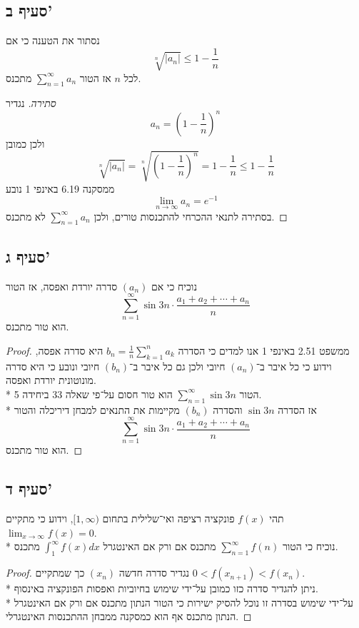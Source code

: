 \subsection{סעיף ב'}
נסתור את הטענה כי אם
\[
	\sqrt[n]{\lvert a_n \rvert} \le 1 - \frac{1}{n}
\]
לכל $n$ אז הטור $\sum_{n = 1}^{\infty} a_n$ מתכנס.
\begin{proof}[סתירה]
	נגדיר
	\[
		a_n = {(1 - \frac{1}{n})}^n
	\]
	ולכן כמובן
	\[
		\sqrt[n]{\lvert a_n \rvert}
		= \sqrt[n]{{(1 - \frac{1}{n})}^n}
		= 1 - \frac{1}{n}
		\le 1 - \frac{1}{n}
	\]
	ממסקנה 6.19 באינפי 1 נובע
	\[
		\lim_{n \to \infty} a_n = e^{-1}
	\]
	בסתירה לתנאי ההכרחי להתכנסות טורים, ולכן $\sum_{n = 1}^{\infty} a_n$ לא מתכנס.
\end{proof}

\subsection{סעיף ג'}
נוכיח כי אם $(a_n)$ סדרה יורדת ואפסה,
אז הטור
\[
	\sum_{n = 1}^{\infty} \sin 3n \cdot \frac{a_1 + a_2 + \cdots + a_n}{n}
\]
הוא טור מתכנס.
\begin{proof}
	ממשפט 2.51 באינפי 1 אנו למדים כי הסדרה $b_n = \frac{1}{n} \sum_{k = 1}^{n} a_k$ היא סדרה אפסה,
	וידוע כי כל איבר ב־$(a_n)$ חיובי ולכן גם כל איבר ב־$(b_n)$ חיובי ונובע כי היא סדרה מונוטונית יורדת ואפסה. \\*
	הטור $\sum_{n = 1}^{\infty} \sin 3n$ הוא טור חסום על־פי שאלה 33 ביחידה 5. \\*
	אז הסדרה $\sin 3n$ והסדרה $(b_n)$ מקיימות את התנאים למבחן דיריכלה והטור
	\[
		\sum_{n = 1}^{\infty} \sin 3n \cdot \frac{a_1 + a_2 + \cdots + a_n}{n}
	\]
	הוא טור מתכנס.
\end{proof}

\subsection{סעיף ד'}
תהי $f(x)$ פונקציה רציפה ואי־שלילית בתחום $[1, \infty)$, וידוע כי מתקיים $\lim_{x \to \infty} f(x) = 0$. \\* %
נוכיח כי הטור $\sum_{n = 1}^{\infty} f(n)$ מתכנס אם ורק אם האינטגרל $\int_{1}^{\infty} f(x) dx$ מתכנס.
\begin{proof}

	נגדיר סדרה חדשה $(x_n)$ כך שמתקיים $0 < f(x_{n + 1}) < f(x_n)$. \\*
	ניתן להגדיר סדרה כזו כמובן על־ידי שימוש בחיוביות ואפסות הפונקציה באינסוף. \\*
	על־ידי שימוש בסדרה זו נוכל להסיק ישירות כי הטור הנתון מתכנס אם ורק אם האינטגרל הנתון מתכנס אף הוא כמסקנה ממבחן ההתכנסות האינטגרלי.
\end{proof}

